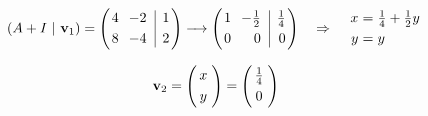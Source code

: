 \begin{frame}
\begin{itemize}
		\[				
		(A+I \ | \ \mathbf{v}_1)
		=
		\left(
		\begin{array}{@{\hspace{0.2\tabcolsep}}r@{\hspace{1.2\tabcolsep}}r@{\hspace{\tabcolsep}}|r@{\hspace{0.2\tabcolsep}}}
		4 & -2 & 1  \\[1mm]
		8 & -4 & 2
		\end{array}
		\right) 
		\xrightarrow[]{\phantom{xx} }		
		\left(
		\begin{array}{@{\hspace{0.2\tabcolsep}}r@{\hspace{1.2\tabcolsep}}r@{\hspace{\tabcolsep}}|r@{\hspace{0.2\tabcolsep}}}
		1 & -\frac{1}{2} & \frac{1}{4}\\[1mm]
		0 &    0 & 0
		\end{array}
		\right) 
		\quad \Rightarrow \quad 
		\begin{array}{@{\hspace{0.3\tabcolsep}}r@{\hspace{0.5\tabcolsep}}c@{\hspace{0.5\tabcolsep}}l@{\hspace{0.5\tabcolsep}}}
		x & = & \frac{1}{4} + \frac{1}{2}y   \\[1mm]
		y & = & y
		\end{array}		
		\]
		
		\vspace{3mm}
		\[
			\mathbf{v}_2 = 
			\left(
			\begin{array}{@{\hspace{0.3\tabcolsep}}c@{\hspace{0.5\tabcolsep}}}
			x   \\[1mm]
			y 
			\end{array}
			\right) 
			=
			\left(
			\begin{array}{@{\hspace{0.3\tabcolsep}}c@{\hspace{0.5\tabcolsep}}}
			\frac{1}{4}   \\[1mm]
			0 
			\end{array}
			\right) 
		\]
		
	\end{itemize}
	
\end{frame}


